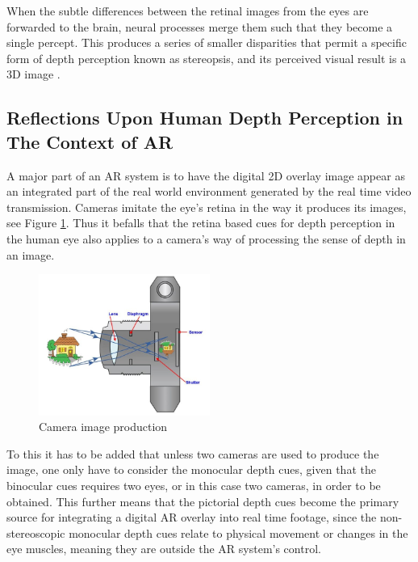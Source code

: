 When the subtle differences between the retinal images from the eyes are forwarded to the brain, neural processes merge them such that they become a single percept. This produces a series of smaller disparities that permit a specific form of depth perception known as stereopsis, and its perceived visual result is a 3D image \cite{Parker2007}.

\subsection{Reflections Upon Human Depth Perception in The Context of AR}
A major part of an AR system is to have the digital 2D overlay image appear as an integrated part of the real world environment generated by the real time video transmission. Cameras imitate the eye’s retina in the way it produces its images, see Figure \ref{fig:camera}. Thus it befalls that the retina based cues for depth perception in the human eye also applies to a camera’s way of processing the sense of depth in an image.

\begin{figure}[h!]
   \centering
   \includegraphics[width=0.5\textwidth]{figures/camera.jpg}
   \caption{Camera image production \cite{Camera}}\label{fig:camera}
\end{figure}

To this it has to be added that unless two cameras are used to produce the image, one only have to consider the monocular depth cues, given that the binocular cues requires two eyes, or in this case two cameras, in order to be obtained. This further means that the pictorial depth cues become the primary source for integrating a digital AR overlay into real time footage, since the non-stereoscopic monocular depth cues relate to physical movement or changes in the eye muscles, meaning they are outside the AR system’s control.


